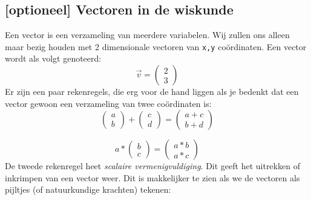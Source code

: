 \documentclass[../syllabus.tex]{subfiles}
\begin{document}
\subsection{[optioneel] Vectoren in de wiskunde}
Een vector is een verzameling van meerdere variabelen. Wij zullen ons alleen maar bezig houden met 2 dimensionale vectoren van \texttt{x,y} co\"ordinaten.
Een vector wordt als volgt genoteerd: 
$$
\vec{v}=
\begin{pmatrix}
2\\3
\end{pmatrix}
$$
Er zijn een paar rekenregels, die erg voor de hand liggen als je bedenkt dat een vector gewoon een verzameling van twee co\"ordinaten is:
$$
\begin{pmatrix}
a\\b
\end{pmatrix}
+
\begin{pmatrix}
c\\d
\end{pmatrix}
=
\begin{pmatrix}
a + c\\b + d
\end{pmatrix}
$$

$$
a * 
\begin{pmatrix}
b \\ c
\end{pmatrix}
=
\begin{pmatrix}
a*b\\a*c
\end{pmatrix}
$$
De tweede rekenregel heet \textit{scalaire vermenigvuldiging}. Dit geeft het uitrekken of inkrimpen van een vector weer. Dit is makkelijker te zien als we de vectoren als pijltjes (of natuurkundige krachten) tekenen:\\
\end{document}

